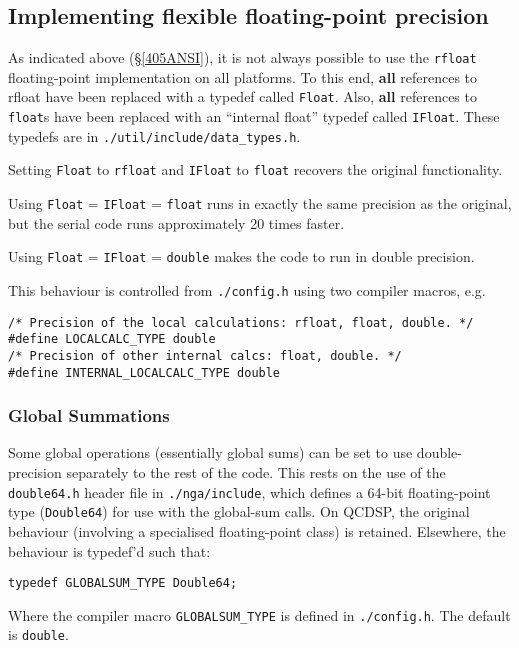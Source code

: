 \documentclass[12pt]{article}
\newcommand{\cde}[1]{{\tt #1}}            %
\begin{document}
\subsection{Implementing flexible floating-point precision}
As indicated above (\S\ref{405ANSI}), it is not always possible to use the \cde{rfloat}
floating-point implementation on all platforms.  To this end, {\bf{all}}
references to rfloat have been replaced with a typedef called \cde{Float}.
Also, {\bf{all}} references to \cde{float}s have been replaced with an
``internal float'' typedef called \cde{IFloat}.  These typedefs are in 
\cde{./util/include/data\_types.h}.  

Setting \cde{Float} to \cde{rfloat} and \cde{IFloat} to \cde{float} recovers
the original functionality.  

Using \cde{Float} = \cde{IFloat} = \cde{float} runs in exactly the same
precision as the original, but the serial code runs approximately 20 times
faster.

Using \cde{Float} = \cde{IFloat} = \cde{double} makes the code to run in
double precision.

This behaviour is controlled from \cde{./config.h} using two compiler macros,
e.g.
\begin{verbatim}
/* Precision of the local calculations: rfloat, float, double. */
#define LOCALCALC_TYPE double
/* Precision of other internal calcs: float, double. */
#define INTERNAL_LOCALCALC_TYPE double
\end{verbatim}

\subsubsection{Global Summations}
Some global operations (essentially global sums) can be set to use 
double-precision separately to the rest of the code.  This rests on the use of
the \cde{double64.h} header file in \cde{./nga/include}, which defines a
64-bit floating-point type (\cde{Double64}) for use with the global-sum calls.
On QCDSP, the original behaviour (involving a specialised floating-point class) is
retained.  Elsewhere, the behaviour is typedef'd such that:
\begin{verbatim}
typedef GLOBALSUM_TYPE Double64;
\end{verbatim}
Where the compiler macro \cde{GLOBALSUM\_TYPE} is defined in \cde{./config.h}.  
The default is \cde{double}.
\end{document}
